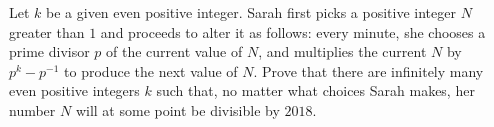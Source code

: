 Let $k$ be a given even positive integer. Sarah first picks a positive integer $N$ greater than $1$ and proceeds to alter it as follows: every minute, she chooses a prime divisor $p$ of the current value of $N$,  and multiplies the current $N$ by $p^k -p^{-1}$ to produce the next value of $N$. Prove that there are infinitely many even positive integers $k$ such that, no matter what choices Sarah makes, her number $N$ will at some point be divisible by $2018$.